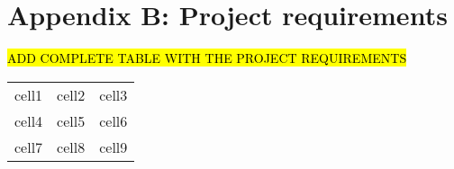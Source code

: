 \renewcommand\thechapter{B}
\chapter{Appendix B: Project requirements}
\label{AppendixB}

\hl{ADD COMPLETE TABLE WITH THE PROJECT REQUIREMENTS}

\begin{center}
	\begin{tabular}{ |c|c|c| } 
		\hline
		cell1 & cell2 & cell3 \\ 
		cell4 & cell5 & cell6 \\ 
		cell7 & cell8 & cell9 \\ 
		\hline
	\end{tabular}
\end{center}

